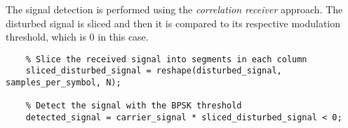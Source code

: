 \noindent The signal detection is performed using the \textsl{correlation receiver} approach. The disturbed signal is sliced and then it is compared to its respective modulation threshold, which is 0 in this case.

\begin{lstlisting}
    % Slice the received signal into segments in each column
    sliced_disturbed_signal = reshape(disturbed_signal, samples_per_symbol, N);
    
    % Detect the signal with the BPSK threshold
    detected_signal = carrier_signal * sliced_disturbed_signal < 0;
\end{lstlisting}